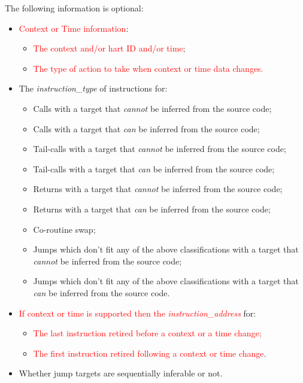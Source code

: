 The following information is optional:

\begin{itemize}
  \item \textcolor{red}{Context or Time information}:
    \begin{itemize}
      \item \textcolor{red}{The context and/or hart ID and/or time};
      \item \textcolor{red}{The type of action to take when context or time data changes.}
    \end{itemize}
  \item The \textit{instruction\_type} of instructions for:
    \begin{itemize}
      \item Calls with a target that \textit{cannot} be inferred from the source code;
      \item Calls with a target that \textit{can} be inferred from the source code;
      \item Tail-calls with a target that \textit{cannot} be inferred from the source code;
      \item Tail-calls with a target that \textit{can} be inferred from the source code;
      \item Returns with a target that \textit{cannot} be inferred from the source code;
      \item Returns with a target that \textit{can} be inferred from the source code;
      \item Co-routine swap;
      \item Jumps which don't fit any of the above classifications with a target that \textit{cannot} be inferred from the source code;
      \item Jumps which don't fit any of the above classifications with a target that \textit{can} be inferred from the source code.
    \end{itemize}
  \item \textcolor{red}{If context or time is supported then the \textit{instruction\_address}} for:
    \begin{itemize}
      \item \textcolor{red}{The last instruction retired before a context or a time change;}
      \item \textcolor{red}{The first instruction retired following a context or time change}.
    \end{itemize}
  \item Whether jump targets are sequentially inferable or not.
\end{itemize}

